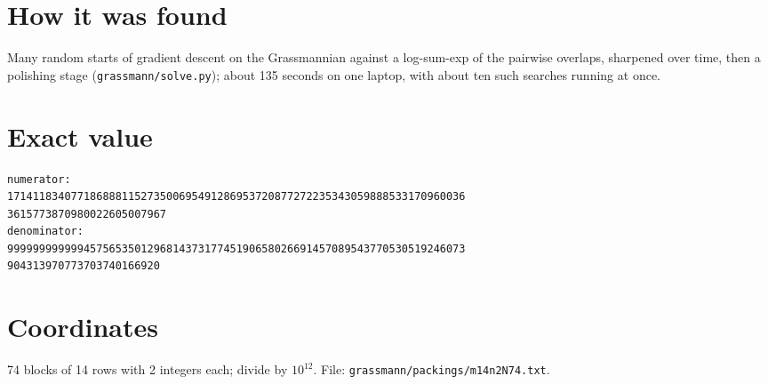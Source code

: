 \documentclass[11pt,a4paper]{article}
\begin{document}
\section{How it was found}
Many random starts of gradient descent on the Grassmannian against a log-sum-exp of the pairwise overlaps, sharpened over time, then a polishing stage (\texttt{grassmann/solve.py}); about 135 seconds on one laptop, with about ten such searches running at once.


\appendix
\section{Exact value}
{\small
\begin{verbatim}
numerator:
171411834077186888115273500695491286953720877272235343059888533170960036
3615773870980022605007967
denominator:
999999999999457565350129681437317745190658026691457089543770530519246073
904313970773703740166920
\end{verbatim}}

\section{Coordinates}
74 blocks of 14 rows with 2 integers each; divide by $10^{12}$. File: \texttt{grassmann/packings/m14n2N74.txt}.
{\tiny
\begin{multicols}{4}
\end{multicols}}
\end{document}

